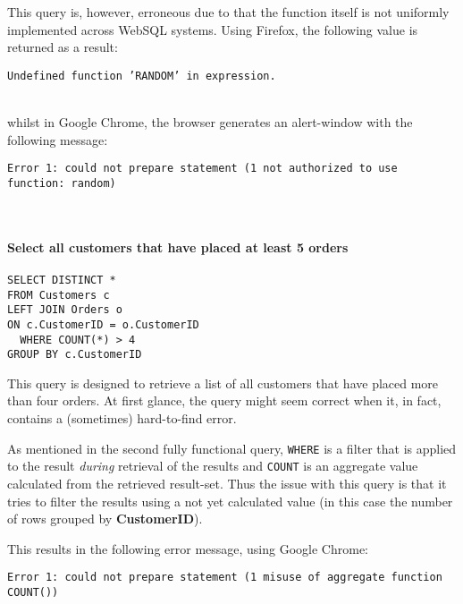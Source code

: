 This query is, however, erroneous due to that the function itself is not
uniformly implemented across WebSQL systems. Using Firefox, the following
value is returned as a result: \\
\begin{centering}
\texttt{Undefined function 'RANDOM' in expression.}
\end{centering}\\
whilst in Google Chrome, the browser generates an alert-window with the
following message:\\
\begin{centering}
\texttt{Error 1: could not prepare statement (1 not authorized to use function: random)}
\end{centering}\\

\paragraph{Select all customers that have placed at least 5 orders}

\begin{lstlisting}[label={sqlstatement4}]
SELECT DISTINCT *
FROM Customers c
LEFT JOIN Orders o
ON c.CustomerID = o.CustomerID
  WHERE COUNT(*) > 4
GROUP BY c.CustomerID 
\end{lstlisting}

This query is designed to retrieve a list of all customers
that have placed more than four orders. At first glance, the
query might seem correct when it, in fact, contains a (sometimes)
hard-to-find error.

As mentioned in the second fully functional query, \texttt{WHERE}
is a filter that is applied to the result \textit{during} retrieval
of the results and \texttt{COUNT} is an aggregate value calculated
from the retrieved result-set. Thus the issue with this query is
that it tries to filter the results using a not yet calculated
value (in this case the number of rows grouped by \textbf{CustomerID}).

This results in the following error message, using Google Chrome:\\
\begin{centering}
\texttt{Error 1: could not prepare statement (1 misuse of aggregate function COUNT())}
\end{centering}


